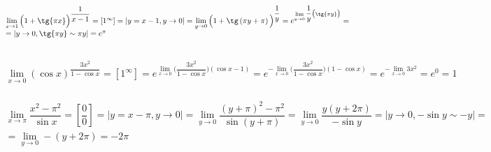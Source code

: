 \documentclass[12pt]{article}
\begin{document}
 \\
$$
\begin{array}{l}
 \lim\limits_{x\rightarrow1} \Big(1+\tg{\pi{x}}\Big)^{\dfrac{1}{x-1}}=\left[1^{\infty}\right] =\left|y=x-1,y\rightarrow0\right|=\lim\limits_{y\rightarrow0} \Big(1+\tg\left({\pi{y}+\pi}\right)\Big)^{\dfrac{1}{y}} = e^{\lim\limits_{y\rightarrow0} \dfrac{1}{y}\big(\tg{\pi{y}}\big)} = \\
=\left|y\rightarrow0,\tg{\pi{y}}\sim{\pi{y}}\right|=e^{\pi}
\end{array}
$$
\\
$$
\begin{array}{l}
 \lim\limits_{x\rightarrow0} \left(\cos{x}\right)^{\dfrac{3x^2}{1-\cos{x}}}=\left[1^{\infty}\right]=e^{\lim\limits_{x\rightarrow0} \Big(\dfrac{3x^2}{1-\cos{x}}\Big)(\cos{x}-1)}=e^{-\lim\limits_{x\rightarrow0} \Big(\dfrac{3x^2}{1-\cos{x}}\Big)(1-\cos{x})}=e^{-\lim\limits_{x\rightarrow0} 3x^2}=e^0=1
\end{array}
$$
\\
$$
\begin{array}{l}
\lim\limits_{x\rightarrow\pi} \dfrac{x^2-{\pi}^2}{\sin{x}}=\left[\dfrac{0}{0}\right]=\left|y=x-\pi,y\rightarrow0\right|=\lim\limits_{y\rightarrow0} \dfrac{\left(y+\pi\right)^2-{\pi}^2}{\sin({y}+\pi)}=\lim\limits_{y\rightarrow0} \dfrac {y(y+2\pi)} {-\sin{y}}=\left|y\rightarrow0,-\sin{y}\sim-{y}\right|=  \\=\lim\limits_{y\rightarrow0} -({y+2\pi})=-2\pi
\end{array}
$$
\end{document}
